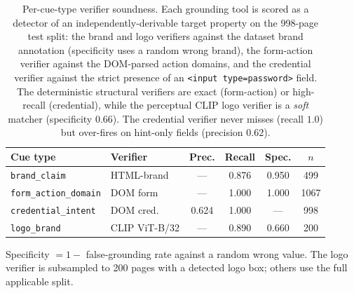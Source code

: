 \begin{table}[!h]
\caption{Per-cue-type verifier soundness. Each grounding tool is scored as a detector of an
independently-derivable target property on the 998-page test split: the brand and logo
verifiers against the dataset brand annotation (specificity uses a random wrong brand), the
form-action verifier against the DOM-parsed action domains, and the credential verifier
against the strict presence of an \texttt{<input type=password>} field. The deterministic
structural verifiers are exact (form-action) or high-recall (credential), while the
perceptual CLIP logo verifier is a \emph{soft} matcher (specificity $0.66$). The
credential verifier never misses (recall $1.0$) but over-fires on hint-only fields
(precision $0.62$).}
\label{tab:verifier_soundness}
\footnotesize
\setlength{\tabcolsep}{3.0pt}
\begin{tabular*}{\columnwidth}{@{\extracolsep{\fill}}llcccc@{}}
\toprule
Cue type & Verifier & Prec. & Recall & Spec. & $n$ \\
\midrule
\texttt{brand\_claim}        & HTML-brand   & ---   & 0.876 & 0.950 & 499 \\
\texttt{form\_action\_domain} & DOM form     & ---   & 1.000 & 1.000 & 1067 \\
\texttt{credential\_intent}   & DOM cred.    & 0.624 & 1.000 & ---   & 998 \\
\texttt{logo\_brand}          & CLIP ViT-B/32 & ---  & 0.890 & 0.660 & 200 \\
\bottomrule
\end{tabular*}

\footnotesize{Specificity $=1-$ false-grounding rate against a random wrong value. The
logo verifier is subsampled to 200 pages with a detected logo box; others use the full
applicable split.}
\end{table}
